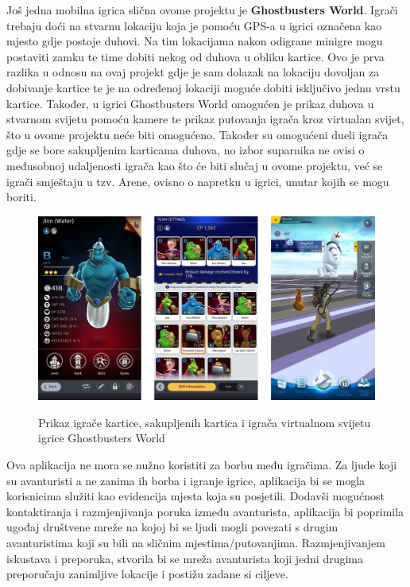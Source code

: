 		\textnormal{Još jedna mobilna igrica slična ovome projektu je \textbf{Ghostbusters World}. Igrači trebaju doći na stvarnu lokaciju koja je pomoću GPS-a u igrici označena kao mjesto gdje postoje duhovi. Na tim lokacijama nakon odigrane minigre mogu postaviti zamku te time dobiti nekog od duhova u obliku kartice. Ovo je prva razlika u odnosu na ovaj projekt gdje je sam dolazak na lokaciju dovoljan za dobivanje kartice te je na određenoj lokaciji moguće dobiti isključivo jednu vrstu kartice. Također, u igrici Ghostbusters World omogućen je prikaz duhova u stvarnom svijetu pomoću kamere te prikaz putovanja igrača kroz virtualan svijet, što u ovome projektu neće biti omogućeno. Također su omogućeni dueli igrača gdje se bore sakupljenim karticama duhova, no izbor suparnika ne ovisi o međusobnoj udaljenosti igrača kao što će biti slučaj u ovome projektu, već se igrači smještaju u tzv. Arene, ovisno o napretku u igrici, unutar kojih se mogu boriti.}
		
		\begin{figure}[H]
			\centering
			\includegraphics[scale=0.45]{slike/Ghostbusters} \\%
			\caption{Prikaz igrače kartice, sakupljenih kartica i igrača virtualnom svijetu igrice Ghostbusters World}
			\label{fig:Ghostbusters} %
		\end{figure}	
		
		\textnormal{Ova aplikacija ne mora se nužno koristiti za borbu među igračima. Za ljude koji su avanturisti a ne zanima ih borba i igranje igrice, aplikacija bi se mogla korisnicima služiti kao evidencija mjesta koja su posjetili. Dodavši mogućnost kontaktiranja i razmjenjivanja poruka između avanturista, aplikacija  bi poprimila ugođaj društvene mreže na kojoj bi se ljudi mogli povezati s drugim avanturistima koji su bili na sličnim mjestima/putovanjima. Razmjenjivanjem iskustava i preporuka, stvorila bi se mreža avanturista koji jedni drugima preporučaju zanimljive lokacije i postižu zadane si ciljeve.}
		
